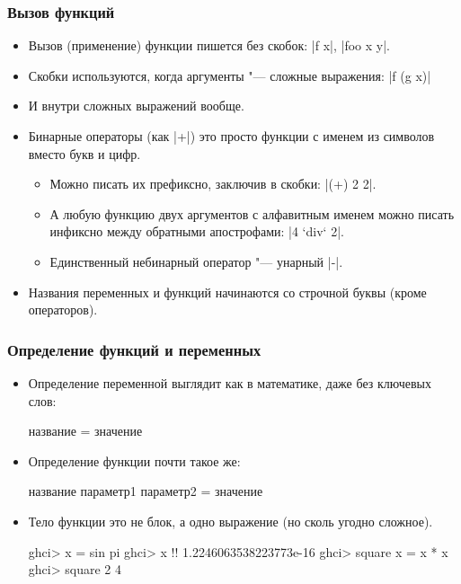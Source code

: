 \documentclass[10pt]{beamer}
\begin{document}
\begin{frame}[fragile]
  \frametitle{Вызов функций}
  \begin{itemize}
    \item Вызов (применение) функции пишется без скобок: \haskinline|f x|, \haskinline|foo x y|.
    \item Скобки используются, когда аргументы "--- сложные выражения: \haskinline|f (g x)|
    \item И внутри сложных выражений вообще.
    \item Бинарные операторы (как \haskinline|+|) это просто функции с именем из символов вместо букв и цифр.
          \begin{itemize}
            \item Можно писать их префиксно, заключив в скобки: \haskinline[breaklines=false]|(+) 2 2|.
            \item А любую функцию двух аргументов с алфавитным именем можно писать инфиксно между обратными апострофами:
                  \haskinline|4 `div` 2|.
            \item Единственный небинарный оператор "--- унарный \haskinline|-|.
          \end{itemize}
    \item Названия переменных и функций начинаются со строчной буквы (кроме операторов).
  \end{itemize}
\end{frame}

\begin{frame}[fragile]
  \frametitle{Определение функций и переменных}
  \begin{itemize}
    \item Определение переменной выглядит как в математике, даже без ключевых слов:
          \begin{haskell}
            название = значение
          \end{haskell}
    \item Определение функции почти такое же:
          \begin{haskell}
            название параметр1 параметр2 = значение
          \end{haskell}
    \item Тело функции это не блок, а одно выражение (но сколь угодно сложное).
          \begin{haskell}
            ghci> x = sin pi
            ghci> x !\pause!
            1.2246063538223773e-16
            ghci> square x = x * x
            ghci> square 2
            4
          \end{haskell}
  \end{itemize}
\end{frame}
\end{document}
